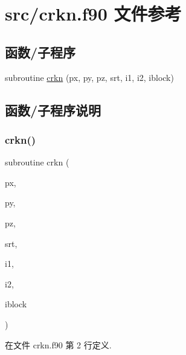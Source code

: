 \hypertarget{crkn_8f90}{}\section{src/crkn.f90 文件参考}
\label{crkn_8f90}
\subsection*{函数/子程序}
\begin{DoxyCompactItemize}
\item 
subroutine \mbox{\hyperlink{crkn_8f90_a2a085d0bd7b1f3fa3adae02b29936bd7}{crkn}} (px, py, pz, srt, i1, i2, iblock)
\end{DoxyCompactItemize}


\subsection{函数/子程序说明}
\mbox{\label{crkn_8f90_a2a085d0bd7b1f3fa3adae02b29936bd7}} 
\subsubsection{\texorpdfstring{crkn()}{crkn()}}
{\footnotesize\ttfamily subroutine crkn (\begin{DoxyParamCaption}\item[{}]{px,  }\item[{}]{py,  }\item[{}]{pz,  }\item[{}]{srt,  }\item[{}]{i1,  }\item[{}]{i2,  }\item[{}]{iblock }\end{DoxyParamCaption})}



在文件 crkn.\+f90 第 2 行定义.


